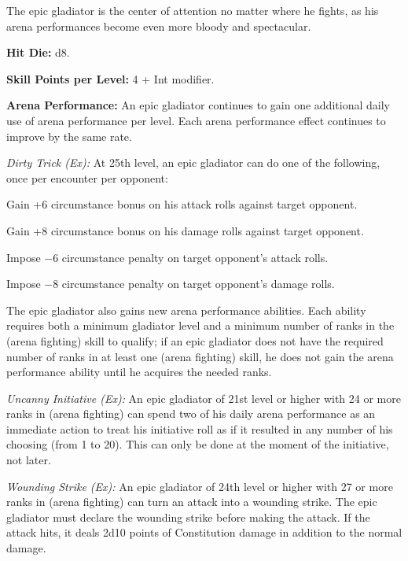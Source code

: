 The epic gladiator is the center of attention no matter where he fights, as his arena performances become even more bloody and spectacular.

\textbf{Hit Die:} d8.

\textbf{Skill Points per Level:} 4 + Int modifier.

\textbf{Arena Performance:} An epic gladiator continues to gain one additional daily use of arena performance per level. Each arena performance effect continues to improve by the same rate.

\textit{Dirty Trick (Ex):} At 25th level, an epic gladiator can do one of the following, once per encounter per opponent:

\begin{itemize*}
\item Gain +6 circumstance bonus on his attack rolls against target opponent.
\item Gain +8 circumstance bonus on his damage rolls against target opponent.
\item Impose $-6$ circumstance penalty on target opponent's attack rolls.
\item Impose $-8$ circumstance penalty on target opponent's damage rolls.
\end{itemize*}

The epic gladiator also gains new arena performance abilities. Each ability requires both a minimum gladiator level and a minimum number of ranks in the  (arena fighting) skill to qualify; if an epic gladiator does not have the required number of ranks in at least one  (arena fighting) skill, he does not gain the arena performance ability until he acquires the needed ranks.

\textit{Uncanny Initiative (Ex):} An epic gladiator of 21st level or higher with 24 or more ranks in  (arena fighting) can spend two of his daily arena performance as an immediate action to treat his initiative roll as if it resulted in any number of his choosing (from 1 to 20). This can only be done at the moment of the initiative, not later.

\textit{Wounding Strike (Ex):} An epic gladiator of 24th level or higher with 27 or more ranks in  (arena fighting) can turn an attack into a wounding strike. The epic gladiator must declare the wounding strike before making the attack. If the attack hits, it deals 2d10 points of Constitution damage in addition to the normal damage.


